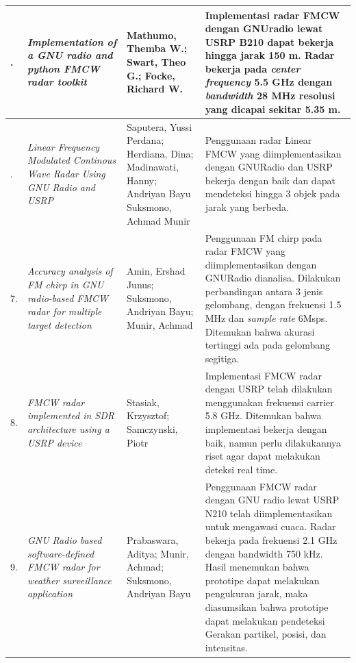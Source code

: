 \begin{center}
\begin{longtable}{|>{\centering\arraybackslash}p{0.6cm}|p{4cm}|p{3cm}|p{5cm}|}
	5. & \textit{Implementation of a GNU radio and python FMCW radar toolkit }\cite{Mathumo2017}
	& Mathumo, Themba W.; Swart, Theo G.; Focke, Richard W.
	& Implementasi radar FMCW dengan GNUradio lewat USRP B210 dapat bekerja hingga jarak 150 m. Radar bekerja pada \textit{center frequency} 5.5 GHz dengan \textit{bandwidth} 28 MHz resolusi yang dicapai sekitar 5.35 m. \\ \hline
	
	6. & \textit{Linear Frequency Modulated Continous Wave Radar Using GNU Radio and USRP}  \cite{Saputera2015}
	& Saputera, Yussi Perdana; Herdiana, Dina; Madinawati, Hanny; Andriyan Bayu Suksmono, Achmad Munir
	& Penggunaan radar Linear FMCW yang diimplementasikan dengan GNURadio dan USRP bekerja dengan baik dan dapat mendeteksi hingga 3 objek pada jarak yang berbeda. \\ \hline
	
	7. & \textit{Accuracy analysis of FM chirp in GNU radio-based FMCW radar for multiple target detection} \cite{Amin2014}
	& Amin, Ershad Junus; Suksmono, Andriyan Bayu; Munir, Achmad
	& Penggunaan FM chirp pada radar FMCW yang diimplementasikan dengan GNURadio dianalisa. Dilakukan perbandingan antara 3 jenis gelombang, dengan frekuensi 1.5 MHz dan \textit{sample rate} 6Msps. Ditemukan bahwa akurasi tertinggi ada pada gelombang segitiga. \\ \hline
	
	8. & \textit{FMCW radar implemented in SDR architecture using a USRP device}\cite{Stasiak2017}
	& Stasiak, Krzysztof; Samczynski, Piotr
	& Implementasi FMCW radar dengan USRP telah dilakukan menggunakan frekuensi carrier 5.8 GHz. Ditemukan bahwa implementasi bekerja dengan baik, namun perlu dilakukannya riset agar dapat melakukan deteksi real time. \\ \hline
	
	9. & \textit{GNU Radio based software-defined FMCW radar for weather surveillance application}\cite{Prabaswara2011}
	& Prabaswara, Aditya; Munir, Achmad; Suksmono, Andriyan Bayu
	& Penggunaan FMCW radar dengan GNU radio lewat USRP N210 telah diimplementasikan untuk mengawasi cuaca. Radar bekerja pada frekuensi 2.1 GHz dengan bandwidth 750 kHz. Hasil menemukan bahwa prototipe dapat melakukan pengukuran jarak, maka diasumsikan bahwa prototipe dapat melakukan pendeteksi Gerakan partikel, posisi, dan intensitas. \\ \hline
	\end{longtable}
\end{center}
